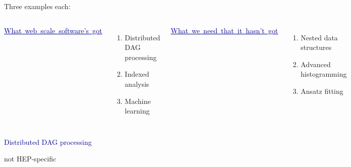 \documentclass[aspectratio=169]{beamer}
\begin{document}
\begin{frame}{Three examples each:}
\Large
\vspace{-0.5 cm}
\begin{columns}[t]
\mbox{\hspace{0.25 cm}\textcolor{darkblue}{\underline{What web scale software's got}}}

\vspace{0.25 cm}
\begin{enumerate}
\item Distributed DAG processing
\item Indexed analysis
\item Machine learning
\end{enumerate}

\mbox{\hspace{0.45 cm}\textcolor{darkblue}{\underline{What we need that it hasn't got}}}

\vspace{0.25 cm}
\begin{enumerate}
\item Nested data structures
\item Advanced histogramming
\item Ansatz fitting
\end{enumerate}

\end{columns}
\end{frame}

\begin{frame}{}
\huge
\vspace{0.5 cm}
\begin{center}
\textcolor{darkblue}{Distributed DAG processing}

\large
\vspace{0.5 cm}
not HEP-specific
\end{center}
\end{frame}
\end{document}
